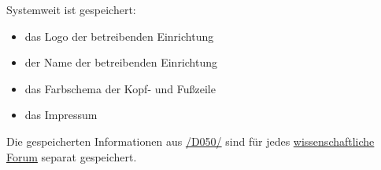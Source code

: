 \begin{description}
	 Systemweit ist gespeichert:
	\begin{itemize}
		\item das Logo der betreibenden Einrichtung
		\item der Name der betreibenden Einrichtung
		\item das Farbschema der Kopf- und Fußzeile
		\item das Impressum
	\end{itemize}

	 Die gespeicherten Informationen aus \hyperref[d050]{/D050/} sind für jedes \hyperref[d030]{wissenschaftliche Forum} separat gespeichert.
\end{description}